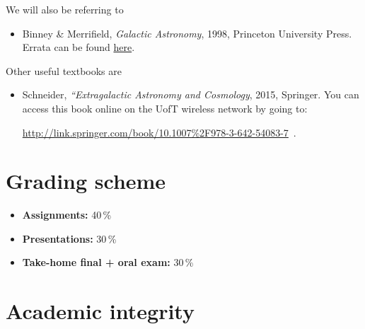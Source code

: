 \documentclass{article}
\begin{document}
We will also be referring to

\begin{itemize}

  \item Binney \& Merrifield, \emph{Galactic Astronomy},
    1998, Princeton University Press. Errata can be found
    \href{http://www-thphys.physics.ox.ac.uk/people/JamesBinney/bmerrors.pdf}{here}.

\end{itemize}

Other useful textbooks are

\begin{itemize}

  \item Schneider, \emph{“Extragalactic Astronomy and Cosmology}, 2015, Springer. You can access this book online on the UofT wireless network by going to:
{\footnotesize \begin{center} \url{http://link.springer.com/book/10.1007%2F978-3-642-54083-7}~.\end{center}}

\end{itemize}

\section*{Grading scheme}

\begin{itemize}

  \item {\bf Assignments:} 40\,\%

  \item {\bf Presentations:} 30\,\%

  \item {\bf Take-home final + oral exam:} 30\,\%

\end{itemize}

\section*{Academic integrity}
\end{document}
